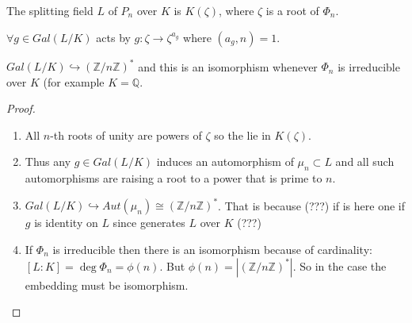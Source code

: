 \begin{theorem}
  The splitting field $L$ of $P_n$ over $K$ is $K\left(\zeta\right)$,
  where $\zeta$ is a root of $\Phi_n$.

  $\forall g \in Gal\left(L/K\right)$ acts by $g: \zeta \to
  \zeta^{a_g}$ where $\left(a_g, n\right) = 1$.

  $Gal\left(L/K\right)  \hookrightarrow
  \left(\mathbb{Z}/n\mathbb{Z}\right)^*$ and this is an isomorphism
  whenever $\Phi_n$ is irreducible over $K$ (for example $K =\mathbb{Q}$.
  \begin{proof}
    \begin{enumerate}
      \item All $n$-th roots of unity are powers of $\zeta$ so the lie
        in  $K\left(\zeta\right)$.
      \item Thus any $g \in Gal\left(L/K\right)$ induces an
        automorphism of $\mu_n \subset L$ and all such automorphisms
        are raising a root to a power that is prime to $n$.
      \item $Gal\left(L/K\right)  \hookrightarrow
        Aut\left(\mu_n\right) \cong 
        \left(\mathbb{Z}/n\mathbb{Z}\right)^*$. That is because (???)
         if is here one if $g$ is identity on $L$ since generates $L$
         over $K$ (???)
       \item If $\Phi_n$ is irreducible then there is an isomorphism
         because of cardinality: $\left[L:K\right] = \deg \Phi_n =
         \phi\left(n\right)$. But
         $\phi\left(n\right) =
         \left|\left(\mathbb{Z}/n\mathbb{Z}\right)^*\right|$. So in
         the case the embedding must be isomorphism. 
    \end{enumerate}    
  \end{proof}
  \label{thm:lec6_3}
\end{theorem}
